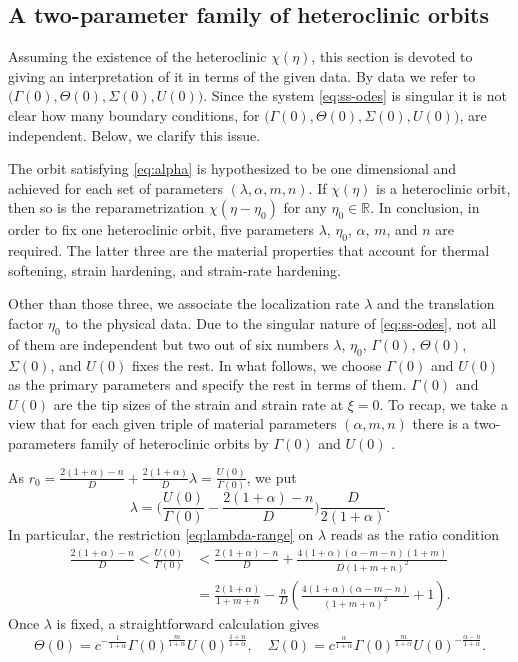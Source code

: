 \documentclass[a4paper,11pt]{article}
\theoremstyle{remark}
\begin{document}
\subsection{A two-parameter family of heteroclinic orbits} \label{sec:twoparam}
Assuming the existence of the heteroclinic $\chi(\eta)$, this section is devoted to giving an interpretation of it in terms of the given data. By  data we refer to 
$\big(\Gamma(0),\Theta(0),\Sigma(0),U(0)\big)$. Since the system \eqref{eq:ss-odes} is singular it is not clear how many boundary conditions, 
for  $\big(\Gamma(0),\Theta(0),\Sigma(0),U(0)\big)$, are independent. Below, we clarify this issue.

The orbit satisfying \eqref{eq:alpha} is hypothesized to be one dimensional and achieved for each set of parameters $(\lambda, \alpha, m,n)$. 
If $\chi(\eta)$ is a heteroclinic orbit, then so is the reparametrization $\chi(\eta-\eta_0)$ for any $\eta_0\in \mathbb{R}$. In conclusion, in order to fix one heteroclinic orbit,  five parameters $\lambda$, $\eta_0$, $\alpha$, $m$, and $n$ are required. 
The latter three are the material properties that account for thermal softening, strain hardening, and strain-rate hardening.

Other than those three, we associate the localization rate $\lambda$  and the translation factor $\eta_0$  to the physical data. Due to the singular nature of \eqref{eq:ss-odes}, not all of them are independent but two out of six numbers $\lambda$, $\eta_0$, $\Gamma(0)$, $\Theta(0)$, $\Sigma(0)$, and $U(0)$ fixes the rest. In what follows, we choose $\Gamma(0)$ and $U(0)$ as the primary parameters and specify the rest in terms of them. $\Gamma(0)$ and $U(0)$ are the tip sizes of the strain and strain rate at $\xi=0$. To recap, we take a view that for each given triple of material parameters $(\alpha,m,n)$ there is a two-parameters family of heteroclinic orbits by $\Gamma(0)$ and $U(0)$ .

As $r_0 = \frac{2(1+\alpha)-n}{D} + \frac{2(1+\alpha)}{D}\lambda = \frac{U(0)}{\Gamma(0)}$,
we put
\begin{equation} \label{eq:lambda}
 \lambda = \Big(\frac{U(0)}{\Gamma(0)} - \frac{2(1+\alpha)-n}{D}\Big)\frac{D}{2(1+\alpha)}.
\end{equation}
In particular, the restriction \eqref{eq:lambda-range} on $\lambda$ reads as the ratio condition
\begin{equation} \label{eq:restriction}
\begin{aligned}
 \frac{2(1+\alpha) -n}{D} < \frac{U(0)}{\Gamma(0)} &< \frac{2(1+\alpha) -n}{D} + \frac{4(1+\alpha)(\alpha-m-n)(1+m)}{D(1+m+n)^2}\\
 &=\frac{2(1+\alpha)}{1+m+n} -\frac{n}{D}\left( \frac{4(1+\alpha)(\alpha-m-n)}{(1+m+n)^2} +1\right).
\end{aligned}
\end{equation}
Once $\lambda$ is fixed, a straightforward calculation gives
$$\Theta(0) = c^{-\frac{1}{1+\alpha}}\Gamma(0)^{\frac{m}{1+\alpha}} U(0)^{\frac{1+n}{1+\alpha}}, \quad \Sigma(0) = c^{\frac{\alpha}{1+\alpha}}\Gamma(0)^{\frac{m}{1+\alpha}} U(0)^{-\frac{\alpha-n}{1+\alpha}}.$$
\end{document}
